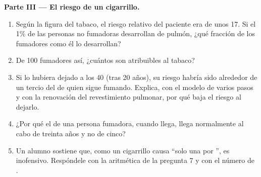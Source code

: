 \begin{problem}
\medskip
\noindent\textbf{Parte III --- El riesgo de un cigarrillo.}
\begin{enumerate}[resume]
  \item Según la figura del tabaco, el riesgo relativo del paciente era
        de unos 17. Si el 1\% de las personas no fumadoras desarrollan
         de pulmón, ¿qué fracción de los fumadores como él lo
        desarrollan?
  \item De 100 fumadores así, ¿cuántos  son atribuibles al
        tabaco?
  \item Si lo hubiera dejado a los 40 (tras 20 años), su riesgo habría
        sido alrededor de un tercio del de quien sigue fumando.
        Explica, con el modelo de varios pasos y con la renovación del
        revestimiento pulmonar, por qué baja el riesgo al dejarlo.
  \item ¿Por qué el  de una persona fumadora, cuando llega,
        llega normalmente al cabo de treinta años y no de cinco?
  \item Un alumno sostiene que, como un cigarrillo causa ``solo una
         por '', es inofensivo. Respóndele con la
        aritmética de la pregunta 7 y con el número de .
\end{enumerate}


\end{problem}
